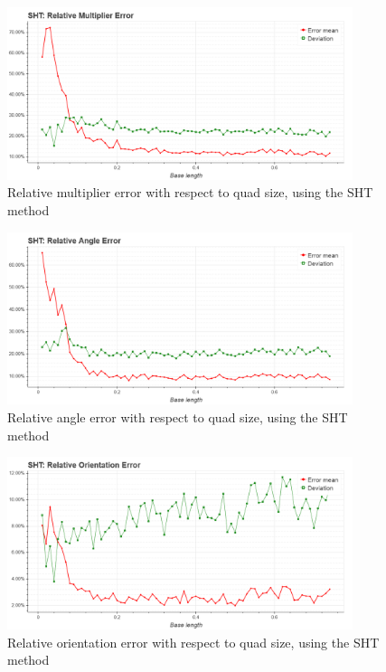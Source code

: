 \begin{figure}[ht]
	\centering
	\includegraphics[width=0.9\textwidth]{figures/plots/sht_relative_multiplier_error.png}
	\caption{Relative multiplier error with respect to quad size, using the SHT method}
	\label{fig:shtRelMulErr}
\end{figure}

\begin{figure}[ht]
	\centering
	\includegraphics[width=0.9\textwidth]{figures/plots/sht_relative_angle_error.png}
	\caption{Relative angle error with respect to quad size, using the SHT method}
	\label{fig:shtRelAngleErr}
\end{figure}

\begin{figure}[ht]
	\centering
	\includegraphics[width=0.9\textwidth]{figures/plots/sht_relative_orientation_error.png}
	\caption{Relative orientation error with respect to quad size, using the SHT method}
	\label{fig:shtRelOrientErr}
\end{figure}

